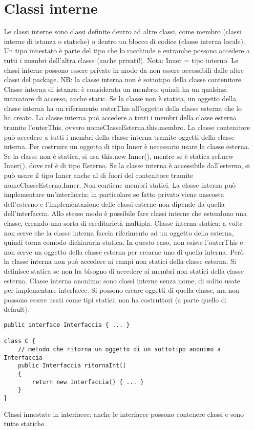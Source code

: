 \section{Classi interne}
Le classi interne sono classi definite dentro ad altre classi, come membro (classi interne di istanza o statiche) o dentro un blocco di codice (classe interna locale). Un tipo innestato è parte del tipo che lo racchiude e entrambe possono accedere a tutti i membri dell'altra classe (anche privati!). Nota: Inner = tipo interno.
Le classi interne possono essere private in modo da non essere accessibili dalle altre classi del package.
NB: la classe interna non è sottotipo della classe contenitore.
Classe interna di istanza: è considerata un membro, quindi ha un qualsiasi marcatore di accesso, anche static. Se la classe non è statica, un oggetto della classe interna ha un riferimento outerThis all'oggetto della classe esterna che lo ha creato.
La classe interna può accedere a tutti i membri della classe esterna tramite l'outerThis, ovvero nomeClasseEsterna.this.membro.
La classe contenitore può accedere a tutti i membri della classe interna tramite oggetti della classe interna.
Per costruire un oggetto di tipo Inner è necessario usare la classe esterna. Se la classe non è statica, si usa this.new Inner(), mentre se è statica ref.new Inner(), dove ref è di tipo Esterno.
Se la classe interna è accessibile dall'esterno, si può usare il tipo Inner anche al di fuori del contenitore tramite nomeClasseEsterna.Inner. 
Non contiene membri statici.
La classe interna può implementare un'interfaccia; in particolare se fatto privato viene nascosta dell'esterno e l'implementazione delle classi esterne non dipende da quella dell'interfaccia. Allo stesso modo è possibile fare classi interne che estendono una classe, creando una sorta di ereditarietà multipla.
Classe interna statica: a volte non serve che la classe interna faccia riferimento ad un oggetto della esterna, quindi torna comodo dichiararla statica. In questo caso, non esiste l'outerThis e non serve un oggetto della classe esterna per crearne uno di quella interna. Però la classe interna non può accedere ai campi non statici della classe esterna.
Si definisce statica se non ha bisogno di accedere ai membri non statici della classe esterna.
Classe interna anonima: sono classi interne senza nome, di solito usate per implementare interfacce. Si possono creare oggetti di quella classe, ma non possono essere usati come tipi statici; non ha costruttori (a parte quello di default). 

\begin{lstlisting}
public interface Interfaccia { ... }

class C {
    // metodo che ritorna un oggetto di un sottotipo anonimo a Interfaccia
    public Interfaccia ritornaInt()
    {
        return new Interfaccia() { ... }
    }
}
\end{lstlisting} 

Classi innestate in interfacce: anche le interfacce possono contenere classi e sono tutte statiche.

